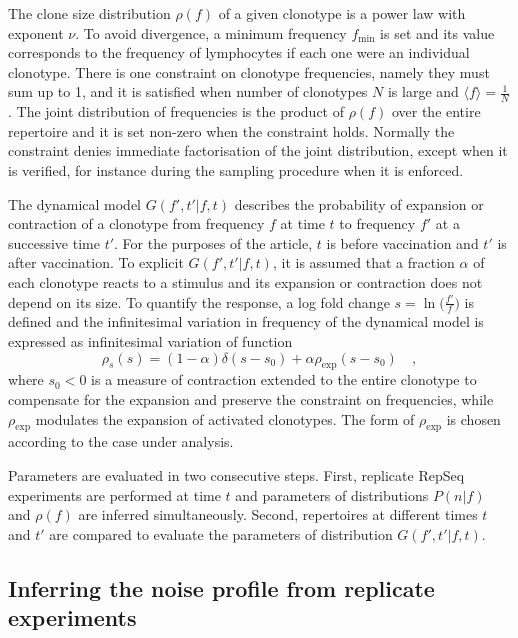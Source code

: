 \documentclass[a4paper,twocolumn]{article}
\begin{document}
The clone size distribution $\rho(f)$ of a given clonotype is a power law with exponent $\nu$. To avoid divergence, a minimum frequency $f_\mathrm{min}$ is set and its value corresponds to the frequency of lymphocytes if each one were an individual clonotype. There is one constraint on clonotype frequencies, namely they must sum up to 1, and it is satisfied when number of clonotypes $N$ is large and $\langle f \rangle = \frac{1}{N}$.
The joint distribution of frequencies is the product of $\rho(f)$ over the entire repertoire and it is set non-zero when the constraint holds. Normally the constraint denies immediate factorisation of the joint distribution, except when it is verified, for instance during the sampling procedure when it is enforced.

The dynamical model $G(f', t'|f, t)$ describes the probability of expansion or contraction of a clonotype from frequency $f$ at time $t$ to frequency $f'$ at a successive time $t'$. For the purposes of the article, $t$ is before vaccination and $t'$ is after vaccination. To explicit $G(f', t'|f, t)$, it is assumed that a fraction $\alpha$ of each clonotype reacts to a stimulus and its expansion or contraction does not depend on its size. To quantify the response, a log fold change $s = \ln \big( \frac{f'}{f} \big)$ is defined and the infinitesimal variation in frequency of the dynamical model is expressed as infinitesimal variation of function
\[
  \rho_s(s) = (1 - \alpha) \delta(s - s_0) + \alpha \rho_\mathrm{exp} (s - s_0) \quad ,
\]
where $s_0 < 0$ is a measure of contraction extended to the entire clonotype to compensate for the expansion and preserve the constraint on frequencies, while $\rho_\mathrm{exp}$ modulates the expansion of activated clonotypes. The form of $\rho_\mathrm{exp}$ is chosen according to the case under analysis.

Parameters are evaluated in two consecutive steps. First, replicate RepSeq experiments are performed at time $t$ and parameters of distributions $P(n|f)$ and $\rho(f)$ are inferred simultaneously. Second, repertoires at different times $t$ and $t'$ are compared to evaluate the parameters of distribution $G(f', t'|f, t)$.

\subsection{Inferring the noise profile from replicate experiments}



\end{document}
